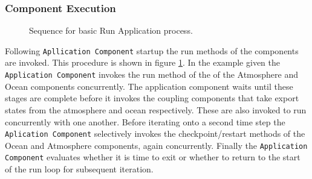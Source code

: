 \subsubsection{Component Execution}

\begin{figure}
\caption[{Basic Run Application}]{Sequence for basic Run Application process.\\}
\label{fig:RunApplicationDiagram}
\end{figure}

Following {\tt Apllication Component} startup the run methods of the components are 
invoked. This procedure is shown in figure \ref{fig:RunApplicationDiagram}. In the 
example given the {\tt Application Component} invokes the run method of the of the
Atmosphere and Ocean components concurrently. The application component waits until
these stages are complete before it invokes the coupling components
that take export states from the atmosphere and ocean respectively. These are also
invoked to run concurrently with one another. Before iterating onto a second time step 
the {\tt Aplication Component} selectively invokes the checkpoint/restart 
methods of the Ocean and Atmosphere components, again concurrently. Finally the
{\tt Application Component} evaluates whether it is time to exit or whether to
return to the start of the run loop for subsequent iteration.

